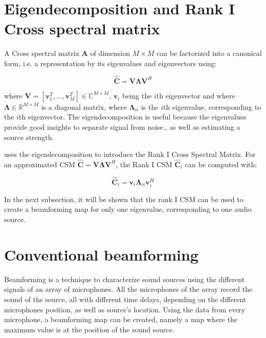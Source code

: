 \documentclass[11pt,a4paper,twoside]{report}
\begin{document}
\section{Eigendecomposition and Rank I Cross spectral matrix}

A Cross spectral matrix $\mathbf{A}$ of dimension $M \times M$ can be factorized into a canonical form, i.e. a representation by its eigenvalues and eigenvectors using:

\begin{equation}
    \label{eigendecomposition}
    \hat{\mathbf{C}} = \mathbf{V} \mathbf{\Lambda} \mathbf{V}^H
\end{equation}

where $\mathbf{V} = [\mathbf{v}_1^T, \dots, \mathbf{v}_M^T] \in \mathbb{C}^{M \times M}$, $\mathbf{v}_i$ being the $i$th eigenvector and where $\mathbf{\Lambda} \in \mathbb{R}^{M \times M}$ is a diagonal matrix, where $\mathbf{\Lambda}_{ii}$ is the $i$th eigenvalue, corresponding to the $i$th eigenvector. The eigendecomposition is useful because the eigenvalues provide good insights to separate signal from noise., as well as estimating a source strength. 

\cite{sarradj2010fast} uses the eigendecomposition to introduce the Rank I Cross Spectral Matrix. For an approximated CSM $\hat{\mathbf{C}} = \mathbf{V} \mathbf{\Lambda} \mathbf{V}^H$, the Rank I CSM $\hat{\mathbf{C}}_i$ can be computed with:

\begin{equation}
    \label{rank_I_csm}
    \hat{\mathbf{C}}_i = \mathbf{v}_i \mathbf{\Lambda}_{ii} \mathbf{v}_{i}^{H}
\end{equation}

In the next subsection, it will be shown that the rank I CSM can be used to create a beamforming map for only one eigenvalue, corresponding to one audio source. 

\section{Conventional beamforming}

Beamforming is a technique to characterize sound sources using the different signals of an array of microphones. All the microphones of the array record the sound of the source, all with different time delays, depending on the different microphones position, as well as source's location. Using the data from every microphone, a beamforming map can be created, namely a map where the maximum value is at the position of the sound source.
\end{document}
